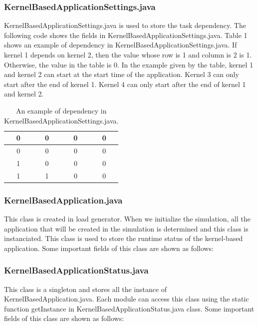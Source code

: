 \subsubsection{KernelBasedApplicationSettings.java}
KernelBasedApplicationSettings.java is used to store the task dependency. The following code shows the fields in KernelBasedApplicationSettings.java. Table 1 shows  an example of dependency in KernelBasedApplicationSettings.java. If kernel 1 depends on kernel 2, then the value whose row is 1 and column is 2 is 1. Otherwise, the value in the table is 0. In the example given by the table, kernel 1 and kernel 2 can start at the start time of the application. Kernel 3 can only start after the end of kernel 1. Kernel 4 can only start after the end of kernel 1 and kernel 2.




\begin{table}
	\centering
	\begin{tabular}{c|c|c|c}
	\hline 
	0 & 0  & 0 & 0\\
	\hline  
	0 & 0 & 0 & 0\\
	\hline
	1 & 0  & 0 & 0\\
	\hline  
	1 & 1 & 0 & 0\\
	\hline 
	\end{tabular}
	\caption{\label{tab:widgets}An example of dependency in KernelBasedApplicationSettings.java.}
\end{table}


\subsubsection{KernelBasedApplication.java}
This class is created in load generator. When we initialize the simulation, all the application that will be created in the simulation is determined and this class is instanciated. This class is used to store the runtime status of the kernel-based application. Some important fields of this class are shown as follows:


\subsubsection{KernelBasedApplicationStatus.java}
This class is a singleton and stores all the instance of KernelBasedApplication.java. Each module can access this class using the static function getInstance in KernelBasedApplicationStatus.java class. Some important fields of this class are shown as follows:


